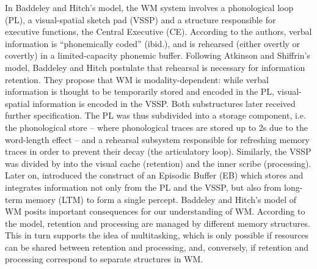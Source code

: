 In Baddeley and Hitch's model, the WM system involves a phonological loop (PL), a visual-spatial sketch pad (VSSP) and a structure responsible for executive functions, the Central Executive (CE). According to the authors, verbal information is ``phonemically coded'' (ibid.), and is rehearsed (either overtly or covertly) in a limited-capacity phonemic buffer. Following Atkinson and Shiffrin's model, Baddeley and Hitch postulate that rehearsal is necessary for information retention. They propose that WM is modality-dependent: while verbal information is thought to be temporarily stored and encoded in the PL, visual-spatial information is encoded in the VSSP. Both substructures later received further specification. The PL was thus subdivided into a storage component, i.e. the phonological store – where phonological traces are stored up to 2s \citep{baddeley_human_1990} due to the word-length effect \citep{baddeley_word_1975} – and a rehearsal subsystem responsible for refreshing memory traces in order to prevent their decay (the articulatory loop). Similarly, the VSSP was divided by \citet{logie_visuo-spatial_1995} into the visual cache (retention) and the inner scribe (processing). Later on, \citet{baddeley_short-term_2000} introduced the construct of an Episodic Buffer (EB) which stores and integrates information not only from the PL and the VSSP, but also from long-term memory (LTM) to form a single percept. Baddeley and Hitch's model of WM posits important consequences for our understanding of WM. According to the model, retention and processing are managed by different memory structures. This in turn supports the idea of multitasking, which is only possible if resources can be shared between retention and processing, and, conversely, if retention and processing correspond to separate structures in WM.


